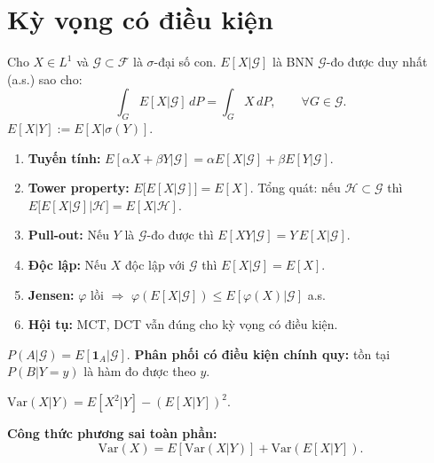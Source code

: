\documentclass[12pt,a4paper]{article}
\begin{document}
\section{Kỳ vọng có điều kiện}

\begin{dinhnghia}[title={Kỳ vọng có điều kiện theo $\sigma$-đại số}]
  Cho $X \in L^1$ và $\mathcal{G} \subset \mathcal{F}$ là $\sigma$-đại số con. $E[X|\mathcal{G}]$ là BNN $\mathcal{G}$-đo được duy nhất (a.s.) sao cho:
  \[
    \int_G E[X|\mathcal{G}]\,dP = \int_G X\,dP, \qquad \forall G \in \mathcal{G}.
  \]
  $E[X|Y] := E[X|\sigma(Y)]$.
\end{dinhnghia}

\begin{tinhchat}[title={Tính chất kỳ vọng có điều kiện}]
  \begin{enumerate}
    \item \textbf{Tuyến tính:} $E[\alpha X + \beta Y|\mathcal{G}] = \alpha E[X|\mathcal{G}] + \beta E[Y|\mathcal{G}]$.
    \item \textbf{Tower property:} $E\bigl[E[X|\mathcal{G}]\bigr] = E[X]$. Tổng quát: nếu $\mathcal{H} \subset \mathcal{G}$ thì $E\bigl[E[X|\mathcal{G}]\big|\mathcal{H}\bigr] = E[X|\mathcal{H}]$.
    \item \textbf{Pull-out:} Nếu $Y$ là $\mathcal{G}$-đo được thì $E[XY|\mathcal{G}] = Y\,E[X|\mathcal{G}]$.
    \item \textbf{Độc lập:} Nếu $X$ độc lập với $\mathcal{G}$ thì $E[X|\mathcal{G}] = E[X]$.
    \item \textbf{Jensen:} $\varphi$ lồi $\Rightarrow$ $\varphi(E[X|\mathcal{G}]) \le E[\varphi(X)|\mathcal{G}]$ a.s.
    \item \textbf{Hội tụ:} MCT, DCT vẫn đúng cho kỳ vọng có điều kiện.
  \end{enumerate}
\end{tinhchat}

\begin{dinhnghia}[title={Xác suất có điều kiện}]
  $P(A|\mathcal{G}) = E[\mathbf{1}_A|\mathcal{G}]$. \textbf{Phân phối có điều kiện chính quy:} tồn tại $P(B|Y = y)$ là hàm đo được theo $y$.
\end{dinhnghia}

\begin{congthuc}[title={Phương sai có điều kiện}]
  $\text{Var}(X|Y) = E[X^2|Y] - (E[X|Y])^2$.

  \textbf{Công thức phương sai toàn phần:}
  \[
    \text{Var}(X) = E[\text{Var}(X|Y)] + \text{Var}(E[X|Y]).
  \]
\end{congthuc}
\end{document}
